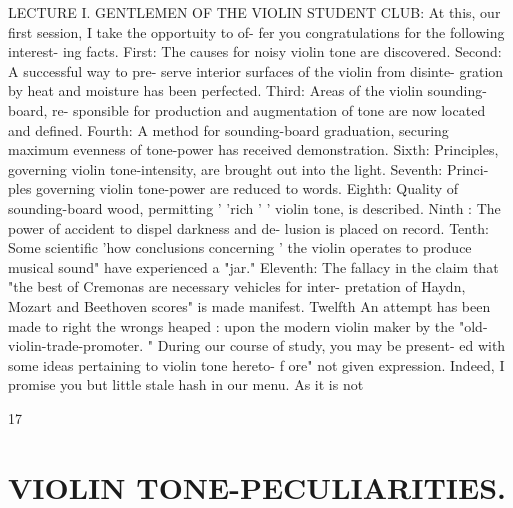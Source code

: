 LECTURE I. GENTLEMEN OF THE VIOLIN STUDENT CLUB: At this, our first session, I take the opportuity to of- fer you congratulations for the following interest- ing facts. First: The causes for noisy violin tone are discovered. Second: A successful way to pre- serve interior surfaces of the violin from disinte- gration by heat and moisture has been perfected. Third: Areas of the violin sounding-board, re- sponsible for production and augmentation of tone are now located and defined. Fourth: A method for sounding-board graduation, securing maximum evenness of tone-power has received demonstration. Sixth: Principles, governing violin tone-intensity, are brought out into the light. Seventh: Princi- ples governing violin tone-power are reduced to words. Eighth: Quality of sounding-board wood, permitting ' 'rich ' ' violin tone, is described. Ninth : The power of accident to dispel darkness and de- lusion is placed on record. Tenth: Some scientific 'how conclusions concerning ' the violin operates to produce musical sound" have experienced a "jar." Eleventh: The fallacy in the claim that "the best of Cremonas are necessary vehicles for inter- pretation of Haydn, Mozart and Beethoven scores" is made manifest. Twelfth An attempt has been made to right the wrongs heaped : upon the modern violin maker by the "old- violin-trade-promoter. " During our course of study, you may be present- ed with some ideas pertaining to violin tone hereto- f ore" not given expression. Indeed, I promise you but little stale hash in our menu. As it is not

17

\section{VIOLIN TONE-PECULIARITIES.}

